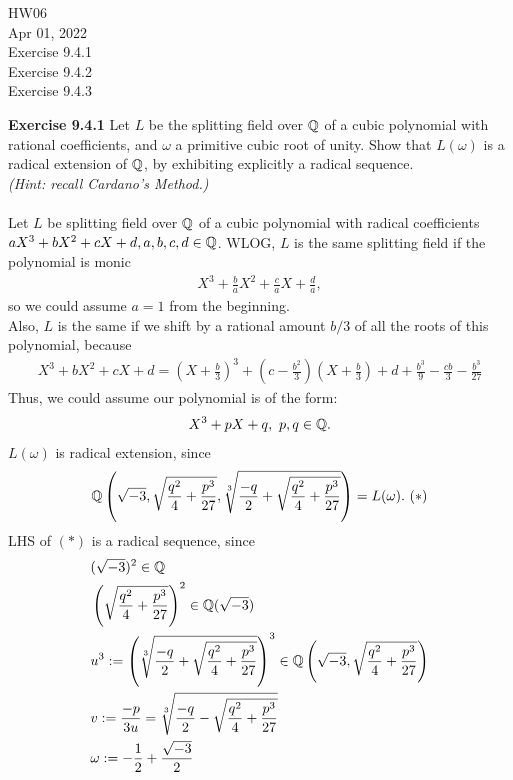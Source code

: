 \documentclass{article}
\begin{document}
\maketitle
HW06 \\
Apr 01, 2022 \\
Exercise 9.4.1\\
Exercise 9.4.2\\
Exercise 9.4.3\\
\pagebreak

\begin{homeworkProblem}
    \textbf{Exercise 9.4.1} Let $L$ be the splitting field over $\mathbb{Q}$ of a cubic polynomial with rational coefficients,
    and $\omega$ a primitive cubic root of unity. Show that $L(\omega)$ is a radical extension of $\mathbb{Q}$, by exhibiting explicitly a radical sequence.\\
    \textit{(Hint: recall Cardano's Method.)}\\
    \solution \\
    Let $L$ be splitting field over $\mathbb{Q}$ of a cubic polynomial with radical coefficients $aX^3 + bX^2 + cX + d, a,b,c,d \in \mathbb{Q}$.
    WLOG, $L$ is the same splitting field if the polynomial is monic
    \begin{align}
        X^3 + \frac{ b }{ a }X^2 + \frac{ c }{ a }X + \frac{ d }{ a }, 
    \end{align}
    so we could assume $a=1$ from the beginning.\\
    Also, $L$ is the same if we shift by a rational amount $b/3$ of all the roots of this polynomial, because
    \begin{align}
        X^3 + b X^2 + cX+d=(X + \frac{ b }{ 3 })^3 + (c - \frac{ b^2 }{ 3 })(X + \frac{ b }{ 3 }) + d + \frac{ b^3 }{ 9 } - \frac{ cb }{ 3 } - \frac{ b^3 }{ 27 }
    \end{align}
    Thus, we could assume our polynomial is of the form:
    \begin{align}
        X^3 + pX + q, \ p,q \in \mathbb{Q}.
    \end{align}
    $L(\omega)$ is radical extension, since
    \begin{align}
        \mathbb{Q} \left(\sqrt{-3}, \sqrt{\frac{ q^2 }{ 4 }+\frac{ p^3 }{ 27 }}, \sqrt[3]{\frac{ -q }{ 2 } + \sqrt{\frac{ q^2 }{ 4 }+\frac{ p^3 }{ 27 }} } \right) = L(\omega). \ (*)
    \end{align}
    LHS of $(*)$ is a radical sequence, since 
    \begin{align}
        & ( \sqrt{-3})^2 \in \mathbb{Q} \\
        & \left( \sqrt{\frac{ q^2 }{ 4 }+\frac{ p^3 }{ 27 }} \right)^2 \in \mathbb{Q}(\sqrt{-3}) \\
        & u^3 := \left( \sqrt[3]{\frac{ -q }{ 2 } + \sqrt{\frac{ q^2 }{ 4 }+\frac{ p^3 }{ 27 }} } \right)^3 \in \mathbb{Q} \left(\sqrt{-3}, \sqrt{\frac{ q^2 }{ 4 }+\frac{ p^3 }{ 27 }} \right) \\
        & v := \frac{ -p }{ 3u } = \sqrt[3]{\frac{ -q }{ 2 } - \sqrt{\frac{ q^2 }{ 4 }+\frac{ p^3 }{ 27 }} }\\
        & \omega := - \frac{ 1 }{ 2 } + \frac{ \sqrt{-3} }{ 2 }
    \end{align}
    

\end{homeworkProblem}
\end{document}
